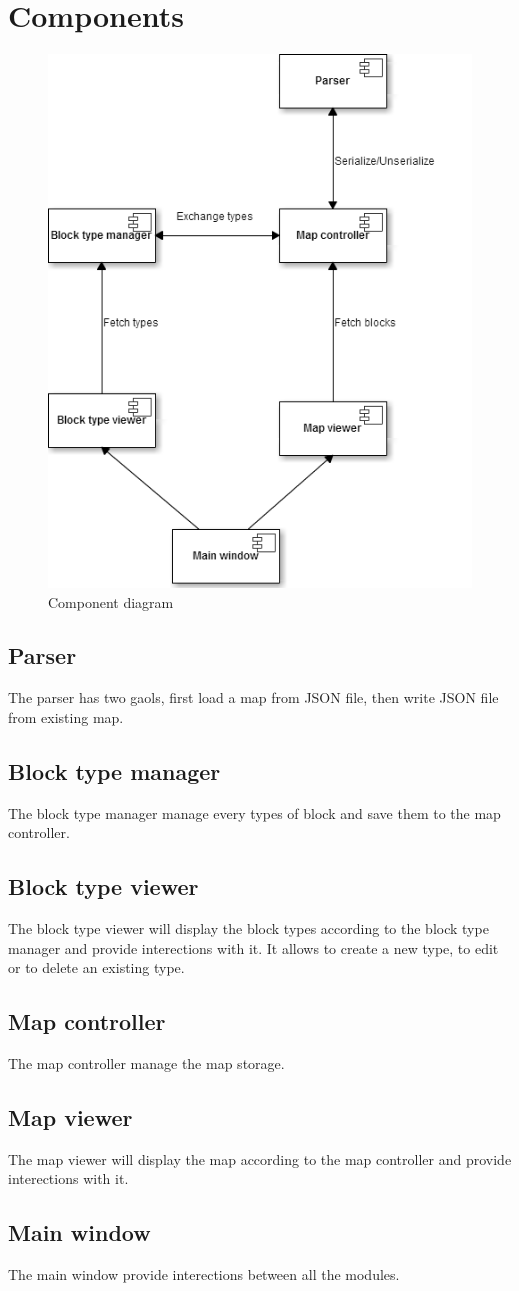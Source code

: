 \newpage
\thispagestyle{empty}

\chapter{Components}

\begin{figure}[H]
	\centering
	\includegraphics[scale=0.70]{component.png}
	\caption{Component diagram}
\end{figure}

\section{Parser}
The parser has two gaols, first load a map from JSON file, then write JSON file from existing map.
\section{Block type manager}
The block type manager manage every types of block and save them to the map controller. 
\section{Block type viewer}
The block type viewer will display the block types according to the block type manager and provide interections with it. It allows to create a new type, to edit or to delete an existing type.
\section{Map controller}
The map controller manage the map storage.
\section{Map viewer}
The map viewer will display the map according to the map controller and provide interections with it.
\section{Main window}
The main window provide interections between all the modules.